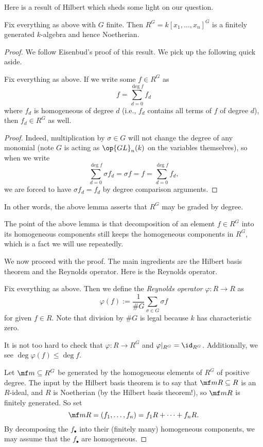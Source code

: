 Here is a result of Hilbert which sheds some light on our question.
\begin{theorem}
	Fix everything as above with $G$ finite. Then $R^G=k[x_1,\ldots,x_n]^G$ is a finitely generated $k$-algebra and hence Noetherian.
\end{theorem}
\begin{proof}
	We follow Eisenbud's proof of this result. We pick up the following quick aside.
	\begin{lemma}
		Fix everything as above. If we write some $f\in R^G$ as
		\[f=\sum_{d=0}^{\deg f}f_d\]
		where $f_d$ is homogeneous of degree $d$ (i.e., $f_d$ contains all terms of $f$ of degree $d$), then $f_d\in R^G$ as well.
	\end{lemma}
	\begin{proof}
		Indeed, multiplication by $\sigma\in G$ will not change the degree of any monomial (note $G$ is acting as $\op{GL}_n(k)$ on the variables themselves), so when we write
		\[\sum_{d=0}^{\deg f}\sigma f_d=\sigma f=f=\sum_{d=0}^{\deg f}f_d,\]
		we are forced to have $\sigma f_d=f_d$ by degree comparison arguments.
	\end{proof}
	\begin{remark}
		In other words, the above lemma asserts that $R^G$ may be graded by degree.
	\end{remark}
	The point of the above lemma is that decomposition of an element $f\in R^G$ into its homogeneous components still keeps the homogeneous components in $R^G$, which is a fact we will use repeatedly.
	
	We now proceed with the proof. The main ingredients are the Hilbert basis theorem and the Reynolds operator. Here is the Reynolds operator.
	\begin{definition}
		Fix everything as above. Then we define the \textit{Reynolds operator} $\varphi:R\to R$ as
		\[\varphi(f):=\frac1{\#G}\sum_{\sigma\in G}\sigma f\]
		for given $f\in R$. Note that division by $\#G$ is legal because $k$ has characteristic zero.
	\end{definition}
	\noindent It is not too hard to check that $\varphi:R\to R^G$ and $\varphi|_{R^G}=\id_{R^G}$. Additionally, we see $\deg\varphi(f)\le\deg f$.

	Let $\mf m\subseteq R^G$ be generated by the homogeneous elements of $R^G$ of positive degree. The input by the Hilbert basis theorem is to say that $\mf mR\subseteq R$ is an $R$-ideal, and $R$ is Noetherian (by the Hilbert basis theorem!), so $\mf mR$ is finitely generated. So set
	\[\mf mR=(f_1,\ldots,f_n)=f_1R+\cdots+f_nR.\]
	By decomposing the $f_\bullet$ into their (finitely many) homogeneous components, we may assume that the $f_\bullet$ are homogeneous.
	

\end{proof}
